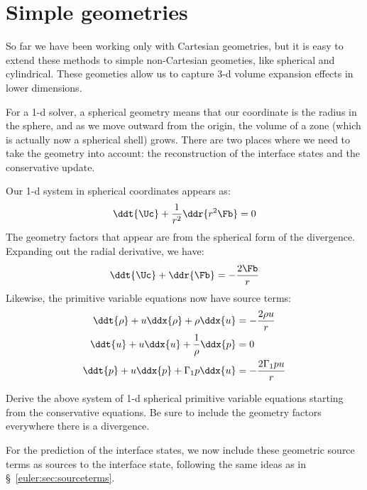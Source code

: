 \section{Simple geometries}
\label{ch:euler:geom}

So far we have been working only with Cartesian geometries, but it is
easy to extend these methods to simple non-Cartesian geometies, like
spherical and cylindrical.  These geometies allow us to capture 3-d
volume expansion effects in lower dimensions.

For a 1-d solver, a spherical geometry means that our coordinate is
the radius in the sphere, and as we move outward from the origin, the
volume of a zone (which is actually now a spherical shell) grows.
There are two places where we need to take the geometry into account:
the reconstruction of the interface states and the conservative update.

Our 1-d system in spherical coordinates appears as:
\begin{equation}
\ddt{\Uc} + \frac{1}{r^2} \ddr{r^2 \Fb} = 0
\end{equation}
The geometry factors that appear are from the spherical form of the
divergence.  Expanding out the radial derivative, we have:
\begin{equation}
\ddt{\Uc} + \ddr{\Fb} = -\frac{2\Fb}{r}
\end{equation}
Likewise, the primitive variable equations now have source terms:
\begin{align}
\ddt{\rho} + u \ddx{\rho} + \rho \ddx{u} &= -\frac{2\rho u}{r} \\
\ddt{u} + u \ddx{u} + \frac{1}{\rho} \ddx{p} &= 0 \\
\ddt{p} + u \ddx{p} + \Gamma_1 p \ddx{u} &= -\frac{2\Gamma_1 p u}{r}
\end{align}

\begin{exercise}
{Derive the above system of 1-d spherical primitive variable equations
  starting from the conservative equations.  Be sure to include the
  geometry factors everywhere there is a divergence.}
\end{exercise}

For the prediction of the interface states, we now include these
geometric source terms as sources to the interface state, following
the same ideas as in \S~\ref{euler:sec:sourceterms}.

